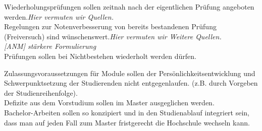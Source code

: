\documentclass[a4paper]{scrartcl}
\begin{document}
\begin{enumerate}
\textcolor{Bernd}{ Wiederholungsprüfungen sollen zeitnah nach der eigentlichen Prüfung angeboten werden.}\textcolor{Brutus}{\emph{Hier vermuten wir Quellen.}}\\

\textcolor{Bernd}{\textbf{\cite{RESO: SoSe2002-RL}} Regelungen zur Notenverbesserung von bereits bestandenen Prüfung (Freiversuch) sind wünschenswert.}\textcolor{Brutus}{\emph{Hier vermuten wir Weitere Quellen.}}\\

\textcolor{Brutus}{\emph{[ANM] stärkere Formulierung}}\\

\textcolor{Bernd}{\textbf{\cite{RESO: SoSe2002-RL}} Prüfungen sollen bei Nichtbestehen wiederholt werden dürfen.}

\end{enumerate}

\textcolor{Bernd}{\textbf{\cite{PROT: WiSe2015-RL}} Zulassungsvoraussetzungen für Module sollen der Persönlichkeitsentwicklung und Schwerpunktsetzung der Studierenden nicht entgegenlaufen. (z.B. durch Vorgeben der Studienreihenfolge).}\\

\textcolor{Bernd}{\textbf{\cite{RESO: SoSe2002-RL}} Defizite aus dem Vorstudium sollen im Master ausgeglichen werden.}\\

\textcolor{Bernd}{\textbf{\cite{PROT: SoSe2018-Akk}} Bachelor-Arbeiten sollen so konzipiert und in den Studienablauf integriert sein, dass man auf jeden Fall zum Master fristgerecht die Hochschule wechseln kann.}\\ %

\end{document}
